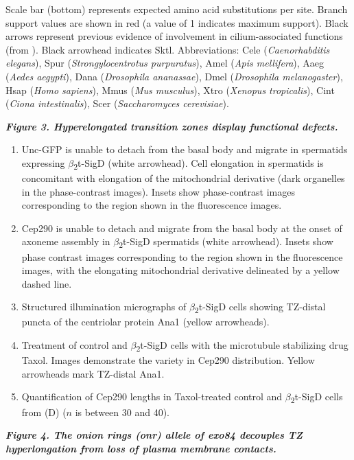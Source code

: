 \documentclass[12pt, twoside, letterpaper]{article}
\newcommand{\sigd}{$\beta$\textsubscript{2}t-SigD}
\begin{document}
\begin{doublespacing}
\begin{linenumbers}
\begin{enumerate}[label={(\Alph*)}, nolistsep]
      Scale bar (bottom) represents expected amino acid substitutions per site. Branch support values are shown in red (a value of 1 indicates maximum support).
      Black arrows represent previous evidence of involvement in cilium-associated functions (from \citep{xu2016phosphatidylinositol}).
      Black arrowhead indicates Sktl.
      Abbreviations: Cele (\textit{Caenorhabditis elegans}), Spur (\textit{Strongylocentrotus purpuratus}), Amel (\textit{Apis mellifera}), Aaeg (\textit{Aedes aegypti}), Dana (\textit{Drosophila ananassae}), Dmel (\textit{Drosophila melanogaster}), Hsap (\textit{Homo sapiens}), Mmus (\textit{Mus musculus}), Xtro (\textit{Xenopus tropicalis}), Cint (\textit{Ciona intestinalis}), Scer (\textit{Saccharomyces cerevisiae}).
    \end{enumerate}
    \bigskip
    \textbf{\itshape Figure 3. Hyperelongated transition zones display functional defects.}
    \begin{enumerate}[label={(\Alph*)}, nolistsep]
    \item Unc-GFP is unable to detach from the basal body and migrate in spermatids expressing \sigd{} (white arrowhead).
      Cell elongation in spermatids is concomitant with elongation of the mitochondrial derivative (dark organelles in the phase-contrast images).
      Insets show phase-contrast images corresponding to the region shown in the fluorescence images.
    \item Cep290 is unable to detach and migrate from the basal body at the onset of axoneme assembly in \sigd{} spermatids (white arrowhead).
      Insets show phase contrast images corresponding to the region shown in the fluorescence images, with the
      elongating mitochondrial derivative delineated by a yellow dashed line.
    \item Structured illumination micrographs of \sigd{} cells showing TZ-distal puncta of the centriolar protein Ana1 (yellow arrowheads).
    \item Treatment of control and \sigd{} cells with the microtubule stabilizing drug Taxol.
      Images demonstrate the variety in Cep290 distribution.
      Yellow arrowheads mark TZ-distal Ana1.
    \item Quantification of Cep290 lengths in Taxol-treated control and \sigd{} cells from (D) ($n$ is between 30 and 40).
    \end{enumerate}
    \bigskip
    \textbf{\itshape Figure 4. The \textit{onion rings} (\textit{onr}) allele of \textit{exo84} decouples TZ hyperlongation from loss of plasma membrane contacts.}

\end{linenumbers}
\end{doublespacing}
\end{document}
